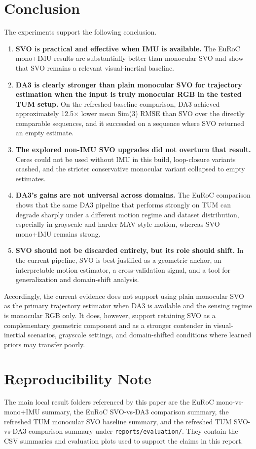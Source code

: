 \documentclass[conference]{IEEEtran}
\begin{document}
\section{Conclusion}
The experiments support the following conclusion.
\begin{enumerate}
\item \textbf{SVO is practical and effective when IMU is available.} The EuRoC mono+IMU results are substantially better than monocular SVO and show that SVO remains a relevant visual-inertial baseline.
\item \textbf{DA3 is clearly stronger than plain monocular SVO for trajectory estimation when the input is truly monocular RGB in the tested TUM setup.} On the refreshed baseline comparison, DA3 achieved approximately 12.5$\times$ lower mean Sim(3) RMSE than SVO over the directly comparable sequences, and it succeeded on a sequence where SVO returned an empty estimate.
\item \textbf{The explored non-IMU SVO upgrades did not overturn that result.} Ceres could not be used without IMU in this build, loop-closure variants crashed, and the stricter conservative monocular variant collapsed to empty estimates.
\item \textbf{DA3's gains are not universal across domains.} The EuRoC comparison shows that the same DA3 pipeline that performs strongly on TUM can degrade sharply under a different motion regime and dataset distribution, especially in grayscale and harder MAV-style motion, whereas SVO mono+IMU remains strong.
\item \textbf{SVO should not be discarded entirely, but its role should shift.} In the current pipeline, SVO is best justified as a geometric anchor, an interpretable motion estimator, a cross-validation signal, and a tool for generalization and domain-shift analysis.
\end{enumerate}

Accordingly, the current evidence does not support using plain monocular SVO as the primary trajectory estimator when DA3 is available and the sensing regime is monocular RGB only. It does, however, support retaining SVO as a complementary geometric component and as a stronger contender in visual-inertial scenarios, grayscale settings, and domain-shifted conditions where learned priors may transfer poorly.

\section*{Reproducibility Note}
The main local result folders referenced by this paper are the EuRoC mono-vs-mono+IMU summary, the EuRoC SVO-vs-DA3 comparison summary, the refreshed TUM monocular SVO baseline summary, and the refreshed TUM SVO-vs-DA3 comparison summary under \texttt{reports/evaluation/}. They contain the CSV summaries and evaluation plots used to support the claims in this report.



\end{document}
